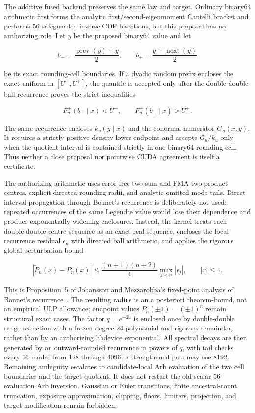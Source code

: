 \documentclass[11pt]{article}
\numberwithin{equation}{section}
\newcommand{\1}{\mathbf 1}
\begin{document}
The additive fused backend preserves the same law and target.  Ordinary
binary64 arithmetic first forms the analytic first/second-eigenmoment
Cantelli bracket and performs 56 safeguarded inverse-CDF bisections, but this
proposal has no authorizing role.  Let $y$ be the proposed binary64 value and
let

\[
 b_-=\frac{\operatorname{prev}(y)+y}{2},\qquad
 b_+=\frac{y+\operatorname{next}(y)}{2}
\]

be its exact rounding-cell boundaries.  If a dyadic random prefix encloses
the exact uniform in $[U^-,U^+]$, the quantile is accepted only after the
double-double ball recurrence proves the strict inequalities

\begin{equation}
 F_u^+(b_-\mid x)<U^-,\qquad F_u^-(b_+\mid x)>U^+.
 \label{eq:d0-jacobi-cuda-cell}
\end{equation}

The same recurrence encloses $k_u(y\mid x)$ and the conormal numerator
$G_u(x,y)$.  It requires a strictly positive density lower endpoint and
accepts $G_u/k_u$ only when the quotient interval is contained strictly in
one binary64 rounding cell.  Thus neither a close proposal nor pointwise CUDA
agreement is itself a certificate.

The authorizing arithmetic uses error-free two-sum and FMA two-product
centres, explicit directed-rounding radii, and analytic omitted-mode tails.
Direct interval propagation through Bonnet's recurrence is deliberately not
used: repeated occurrences of the same Legendre value would lose their
dependence and produce exponentially widening enclosures.  Instead, the
kernel treats each double-double centre sequence as an exact real sequence,
encloses the local recurrence residual $\epsilon_n$ with directed ball
arithmetic, and applies the rigorous global perturbation bound

\[
 \left|\widetilde P_n(x)-P_n(x)\right|
 \leq \frac{(n+1)(n+2)}{4}\max_{j<n}|\epsilon_j|,
 \qquad |x|\leq1.
\]

This is Proposition~5 of Johansson and Mezzarobba's fixed-point analysis of
Bonnet's recurrence~\cite{johansson2018legendre}.  The resulting radius is an
a posteriori theorem-bound, not an empirical ULP allowance; endpoint values
$P_n(\pm1)=(\pm1)^n$ remain structural exact cases.
The factor $q=e^{-2u}$ is enclosed once by double-double range reduction with
a frozen degree-24 polynomial and rigorous remainder, rather than by an
authorizing libdevice exponential.  All spectral decays are then generated
by an outward-rounded recurrence in powers of $q$, with tail checks every 16
modes from 128 through 4096; a strengthened pass may use 8192.  Remaining
ambiguity escalates to candidate-local Arb evaluation of the two cell
boundaries and the target quotient.  It does not restart the old scalar
56-evaluation Arb inversion.  Gaussian or Euler transitions, finite
ancestral-count truncation, exposure approximation, clipping, floors,
limiters, projection, and target modification remain forbidden.
\end{document}
